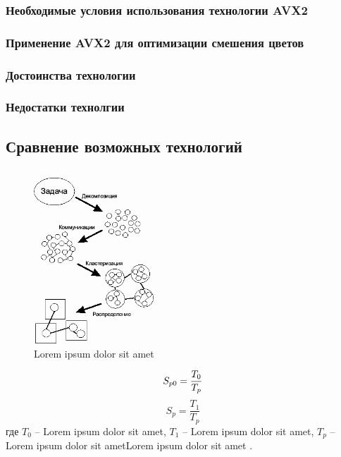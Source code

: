 \subsubsection{Необходимые условия использования технологии AVX2}
\subsubsection{Применение AVX2 для оптимизации смешения цветов}
\subsubsection{Достоинства технологии}
\subsubsection{Недостатки технолгии}
\subsection{Сравнение возможных технологий}
\subsection{}



\begin{figure}[h!]
	\centering
	\includegraphics[width=0.4\textwidth]{img/img1.png}
	\caption{Lorem ipsum dolor sit amet}
	\label{fig:spire05}
\end{figure}


\begin{equation}
S_{p0}=\frac{T_{0} }{T_{p}} \\
\label{F:100}
\end{equation}
\begin{equation}
S_{p}=\frac{T_{1} }{T_{p}}
\label{F:101}
\end{equation}
где $T_{0}$ -- Lorem ipsum dolor sit amet, $T_{1}$ -- Lorem ipsum dolor sit amet, $T_{p}$ -- Lorem ipsum dolor sit ametLorem ipsum dolor sit amet \cite{book2}. 

